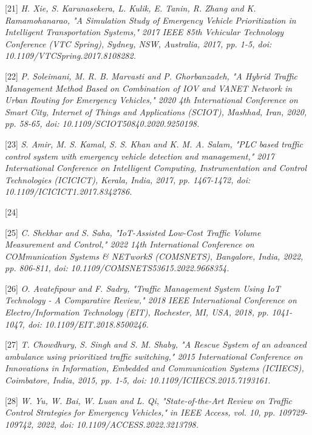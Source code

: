 \documentclass[conference]{IEEEtran}
\begin{document}
[21] \emph{ H. Xie, S. Karunasekera, L. Kulik, E. Tanin, R. Zhang and K. Ramamohanarao, "A Simulation Study of Emergency Vehicle Prioritization in Intelligent Transportation Systems," 2017 IEEE 85th Vehicular Technology Conference (VTC Spring), Sydney, NSW, Australia, 2017, pp. 1-5, doi: 10.1109/VTCSpring.2017.8108282.
}

[22] \emph{ P. Soleimani, M. R. B. Marvasti and P. Ghorbanzadeh, "A Hybrid Traffic Management Method Based on Combination of IOV and VANET Network in Urban Routing for Emergency Vehicles," 2020 4th International Conference on Smart City, Internet of Things and Applications (SCIOT), Mashhad, Iran, 2020, pp. 58-65, doi: 10.1109/SCIOT50840.2020.9250198.}

[23] \emph{ S. Amir, M. S. Kamal, S. S. Khan and K. M. A. Salam, "PLC based traffic control system with emergency vehicle detection and management," 2017 International Conference on Intelligent Computing, Instrumentation and Control Technologies (ICICICT), Kerala, India, 2017, pp. 1467-1472, doi: 10.1109/ICICICT1.2017.8342786.}

[24] 

[25] \emph{ C. Shekhar and S. Saha, "IoT-Assisted Low-Cost Traffic Volume Measurement and Control," 2022 14th International Conference on COMmunication Systems & NETworkS (COMSNETS), Bangalore, India, 2022, pp. 806-811, doi: 10.1109/COMSNETS53615.2022.9668354. }

[26]\emph{ O. Avatefipour and F. Sadry, "Traffic Management System Using IoT Technology - A Comparative Review," 2018 IEEE International Conference on Electro/Information Technology (EIT), Rochester, MI, USA, 2018, pp. 1041-1047, doi: 10.1109/EIT.2018.8500246.
}

[27] \emph{ T. Chowdhury, S. Singh and S. M. Shaby, "A Rescue System of an advanced ambulance using prioritized traffic switching," 2015 International Conference on Innovations in Information, Embedded and Communication Systems (ICIIECS), Coimbatore, India, 2015, pp. 1-5, doi: 10.1109/ICIIECS.2015.7193161. }

[28] \emph{ W. Yu, W. Bai, W. Luan and L. Qi, "State-of-the-Art Review on Traffic Control Strategies for Emergency Vehicles," in IEEE Access, vol. 10, pp. 109729-109742, 2022, doi: 10.1109/ACCESS.2022.3213798. }
\end{document}
